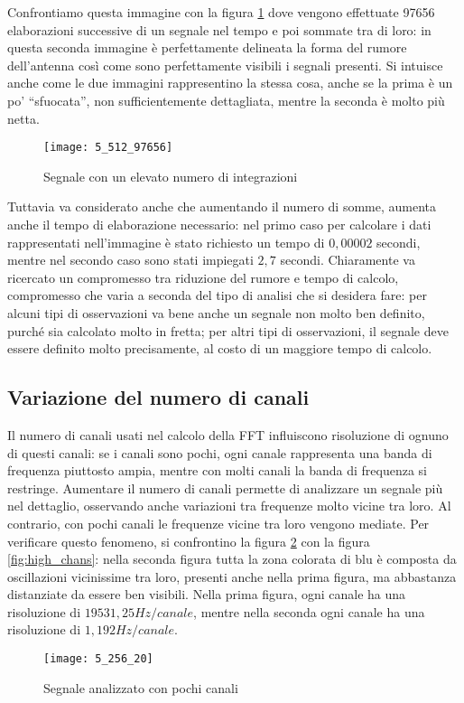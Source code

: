 Confrontiamo questa immagine con la figura \ref{fig:high_int} dove vengono
effettuate 97656 elaborazioni successive di un segnale nel tempo e poi sommate
tra di loro: in questa seconda immagine \`e perfettamente delineata la forma del
rumore dell'antenna cos\`i come sono perfettamente visibili i segnali presenti.
Si intuisce anche come le due immagini rappresentino la stessa cosa, anche se la
prima \`e un po' ``sfuocata'', non sufficientemente dettagliata, mentre la
seconda \`e molto pi\`u netta.
\begin{figure}[htb]
	\begin{center}
		\texttt{[image: 5\_512\_97656]}
	\end{center}
	\caption{Segnale con un elevato numero di integrazioni}
	\label{fig:high_int}
\end{figure}

Tuttavia va considerato anche che aumentando il numero di somme, aumenta anche
il tempo di elaborazione necessario: nel primo caso per calcolare i dati
rappresentati nell'immagine \`e stato richiesto un tempo di $0,00002$ secondi,
mentre nel secondo caso sono stati impiegati $2,7$ secondi.  Chiaramente va
ricercato un compromesso tra riduzione del rumore e tempo di calcolo,
compromesso che varia a seconda del tipo di analisi che si desidera fare: per
alcuni tipi di osservazioni va bene anche un segnale non molto ben definito,
purch\'e sia calcolato molto in fretta; per altri tipi di osservazioni, il
segnale deve essere definito molto precisamente, al costo di un maggiore tempo
di calcolo.

\subsection{Variazione del numero di canali}
Il numero di canali usati nel calcolo della \ac{FFT} influiscono risoluzione di
ognuno di questi canali: se i canali sono pochi, ogni canale rappresenta una
banda di frequenza piuttosto ampia, mentre con molti canali la banda di
frequenza si restringe. Aumentare il numero di canali permette di analizzare un
segnale pi\`u nel dettaglio, osservando anche variazioni tra frequenze molto
vicine tra loro. Al contrario, con pochi canali le frequenze vicine tra loro
vengono mediate. Per verificare questo fenomeno, si confrontino la figura
\ref{fig:low_chans} con la figura \ref{fig:high_chans}: nella seconda figura
tutta la zona colorata di blu \`e composta da oscillazioni vicinissime tra loro,
presenti anche nella prima figura, ma abbastanza distanziate da essere ben
visibili. Nella prima figura, ogni canale ha una risoluzione di $19531,25
Hz/canale$, mentre nella seconda ogni canale ha una risoluzione di $1,192
Hz/canale$.
\begin{figure}[htb]
	\begin{center}
		\texttt{[image: 5\_256\_20]}
	\end{center}
	\caption{Segnale analizzato con pochi canali}
	\label{fig:low_chans}
\end{figure}

